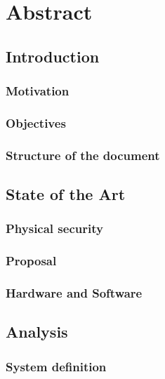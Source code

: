 \chapter{Abstract}\label{ch:abstract}
\section{Introduction}\label{sec:introduction}

\subsection{Motivation}\label{subsec:motivation}

\subsection{Objectives}\label{subsec:objectives}

\subsection{Structure of the document}\label{subsec:structure-of-the-document}


\section{State of the Art}\label{sec:state-of-the-art}

\subsection{Physical security}\label{subsec:physical-security}

\subsection{Proposal}\label{subsec:proposal}

\subsection{Hardware and Software}\label{subsec:hardware-and-software}


\section{Analysis}\label{sec:analysis}

\subsection{System definition}\label{subsec:system-definition}

